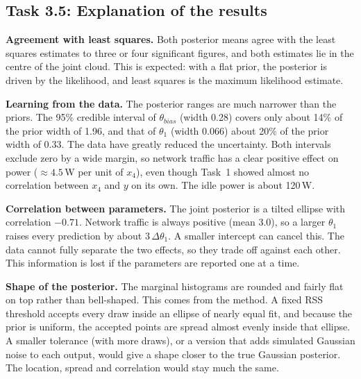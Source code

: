 \subsection{Task 3.5: Explanation of the results}
\textbf{Agreement with least squares.} Both posterior means agree with the least squares estimates to three or four significant figures, and both estimates lie in the centre of the joint cloud. This is expected: with a flat prior, the posterior is driven by the likelihood, and least squares is the maximum likelihood estimate.

\textbf{Learning from the data.} The posterior ranges are much narrower than the priors. The 95\% credible interval of $\theta_{bias}$ (width 0.28) covers only about 14\% of the prior width of 1.96, and that of $\theta_1$ (width 0.066) about 20\% of the prior width of 0.33. The data have greatly reduced the uncertainty. Both intervals exclude zero by a wide margin, so network traffic has a clear positive effect on power ($\approx4.5$\,W per unit of $x_4$), even though Task~1 showed almost no correlation between $x_4$ and $y$ on its own. The idle power is about 120\,W.

\textbf{Correlation between parameters.} The joint posterior is a tilted ellipse with correlation $-0.71$. Network traffic is always positive (mean 3.0), so a larger $\theta_1$ raises every prediction by about $3\,\Delta\theta_1$. A smaller intercept can cancel this. The data cannot fully separate the two effects, so they trade off against each other. This information is lost if the parameters are reported one at a time.

\textbf{Shape of the posterior.} The marginal histograms are rounded and fairly flat on top rather than bell-shaped. This comes from the method. A fixed RSS threshold accepts every draw inside an ellipse of nearly equal fit, and because the prior is uniform, the accepted points are spread almost evenly inside that ellipse. A smaller tolerance (with more draws), or a version that adds simulated Gaussian noise to each output, would give a shape closer to the true Gaussian posterior. The location, spread and correlation would stay much the same.
